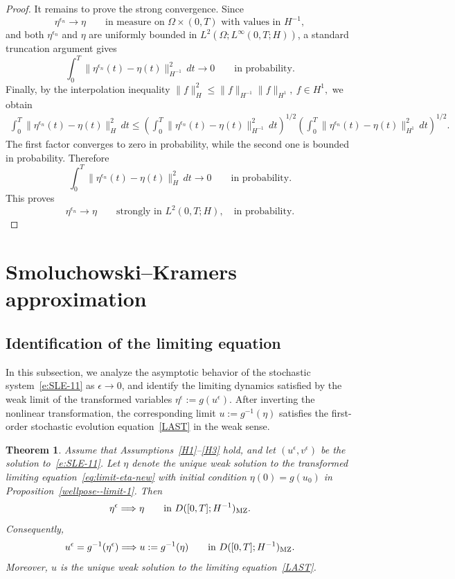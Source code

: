 \documentclass[11pt]{article}
\theoremstyle{plain}
\newtheorem{theorem}{Theorem}[section]
\numberwithin{equation}{section}
\begin{document}
\begin{proof}
It remains to prove the strong convergence. Since
\[
\eta^{\epsilon_n}\to\eta \qquad \text{in measure on }\Omega\times(0,T)\text{ with values in }H^{-1},
\]
and both \(\eta^{\epsilon_n}\) and \(\eta\) are uniformly bounded in \(L^2(\Omega;L^\infty(0,T;H))\), a standard truncation argument gives
\[
\int_0^T \|\eta^{\epsilon_n}(t)-\eta(t)\|_{H^{-1}}^2\,dt\to0 \qquad \text{in probability}.
\]
Finally, by the interpolation inequality \(\|f\|_H^2\le\|f\|_{H^{-1}}\|f\|_{H^1},~ f\in H^1,\) we obtain
\[
\begin{aligned}
\int_0^T\|\eta^{\epsilon_n}(t)-\eta(t)\|_H^2\,dt\le\left(\int_0^T\|\eta^{\epsilon_n}(t)-\eta(t)\|_{H^{-1}}^2\,dt\right)^{1/2}  
\left(\int_0^T\|\eta^{\epsilon_n}(t)-\eta(t)\|_{H^1}^2\,dt\right)^{1/2}.
\end{aligned}
\]
The first factor converges to zero in probability, while the second one is bounded in probability. Therefore
\[
\int_0^T\|\eta^{\epsilon_n}(t)-\eta(t)\|_H^2\,dt\to0 \qquad \text{in probability}.
\]
This proves
\[
\eta^{\epsilon_n}\to\eta \qquad\text{strongly in }L^2(0,T;H),\quad \text{in probability}.
\]
\end{proof}


  
 
 



\section{Smoluchowski--Kramers approximation}\label{prf}
 
 

 \subsection{Identification of the limiting equation}\label{sec:limit-eq}


In this subsection, we analyze the asymptotic behavior of the stochastic system~\eqref{e:SLE-11} as \(\epsilon\to0\), and identify the limiting
dynamics satisfied by the weak limit of the transformed variables \(\eta^\epsilon:=g(u^\epsilon).\)
After inverting the nonlinear transformation, the corresponding limit
\(u:=g^{-1}(\eta)\) satisfies the first-order stochastic evolution equation~\eqref{LAST} in the weak sense.


\begin{theorem}\label{thm:main4}
Assume that Assumptions~\ref{H1}--\ref{H3} hold, and let
\((u^\epsilon,v^\epsilon)\) be the solution to~\eqref{e:SLE-11}.
Let \(\eta\) denote the unique weak solution to the transformed limiting
equation~\eqref{eq:limit-eta-new} with initial condition
\(\eta(0)=g(u_0)\)  in Proposition~\ref{wellpose--limit-1}. Then
\[
\eta^\epsilon\Longrightarrow\eta
\qquad\text{in }D([0,T];H^{-1})_{\rm MZ}.
\]
Consequently,
\[
u^\epsilon=g^{-1}(\eta^\epsilon)
\Longrightarrow
u:=g^{-1}(\eta)
\qquad\text{in }D([0,T];H^{-1})_{\rm MZ}.
\]
Moreover, \(u\) is the unique weak solution to the limiting
equation~\eqref{LAST}.
\end{theorem}
\end{document}
